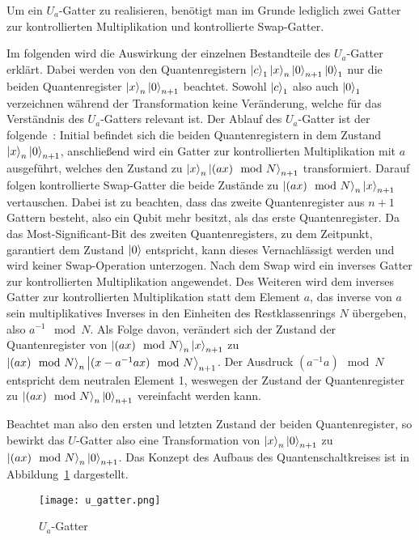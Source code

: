 Um ein \(U_a\)-Gatter zu realisieren, benötigt man im Grunde lediglich zwei Gatter zur kontrollierten Multiplikation und 
kontrollierte Swap-Gatter. 

Im folgenden wird die Auswirkung der einzelnen Bestandteile des \(U_a\)-Gatter erklärt.
Dabei werden von den Quantenregistern \(\ket{c}_1\ket{x}_{n}\ket{0}_{n+1}\ket{0}_1\) nur die beiden 
Quantenregister \(\ket{x}_{n}\ket{0}_{n+1}\) beachtet.
Sowohl \(\ket{c}_1\) also auch \(\ket{0}_1\) verzeichnen während der Transformation keine Veränderung, 
welche für das Verständnis des \(U_a\)-Gatters relevant ist.
Der Ablauf des \(U_a\)-Gatter ist der folgende~\cite{beauregard2003circuit}:
Initial befindet sich die beiden Quantenregistern in dem Zustand \(\ket{x}_{n}\ket{0}_{n+1}\), 
anschließend wird ein Gatter zur kontrollierten Multiplikation mit \(a\) ausgeführt, 
welches den Zustand zu \(\ket{x}_{n}\ket{(ax)\mod N}_{n+1}\) transformiert.
Darauf folgen kontrollierte Swap-Gatter die beide Zustände zu \(\ket{(ax)\mod N}_{n}\ket{x}_{n+1}\) vertauschen.
Dabei ist zu beachten, 
dass das zweite Quantenregister aus \(n+1\) Gattern besteht, 
also ein Qubit mehr besitzt, als das erste Quantenregister.
Da das Most-Significant-Bit des zweiten Quantenregisters, zu dem Zeitpunkt, garantiert dem Zustand \(\ket{0}\) entspricht, 
kann dieses Vernachlässigt werden und wird keiner Swap-Operation unterzogen.
Nach dem Swap wird ein inverses Gatter zur kontrollierten Multiplikation angewendet.
Des Weiteren wird dem inverses Gatter zur kontrollierten Multiplikation statt dem Element \(a\), 
das inverse von \(a\) sein multiplikatives Inverses in den Einheiten des Restklassenrings \(N\) übergeben, 
also \(a^{-1} \mod N\).
Als Folge davon, verändert sich der Zustand der Quantenregister von \(\ket{(ax)\mod N}_{n}\ket{x}_{n+1}\) 
zu \(\ket{(ax)\mod N}_{n}\ket{(x-a^{-1}ax)\mod N}_{n+1}\).
Der Ausdruck \((a^{-1}a)\mod N\) entspricht dem neutralen Element 1, 
weswegen der Zustand der Quantenregister zu \(\ket{(ax)\mod N}_{n}\ket{0}_{n+1}\) vereinfacht werden kann.

Beachtet man also den ersten und letzten Zustand der beiden Quantenregister, 
so bewirkt das \(U\)-Gatter also eine Transformation von \(\ket{x}_{n}\ket{0}_{n+1}\) zu \(\ket{(ax)\mod N}_{n}\ket{0}_{n+1}\).
Das Konzept des Aufbaus des Quantenschaltkreises ist in Abbildung~\ref{fig:u_gatter} dargestellt.
\begin{figure} [H]
  \caption{\(U_a\)-Gatter~\cite{beauregard2003circuit}}
  \label{fig:u_gatter}
  \texttt{[image: u\_gatter.png]}
  \centering
  \end{figure}

